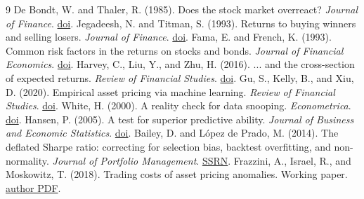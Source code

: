 \documentclass[10pt,a4paper]{article}
\begin{document}
\begin{thebibliography}{9}
 De Bondt, W. and Thaler, R. (1985). Does the stock market overreact? \emph{Journal of Finance}. \href{https://doi.org/10.1111/j.1540-6261.1985.tb05004.x}{doi}.
 Jegadeesh, N. and Titman, S. (1993). Returns to buying winners and selling losers. \emph{Journal of Finance}. \href{https://doi.org/10.1111/j.1540-6261.1993.tb04702.x}{doi}.
 Fama, E. and French, K. (1993). Common risk factors in the returns on stocks and bonds. \emph{Journal of Financial Economics}. \href{https://doi.org/10.1016/0304-405X(93)90023-5}{doi}.
 Harvey, C., Liu, Y., and Zhu, H. (2016). ... and the cross-section of expected returns. \emph{Review of Financial Studies}. \href{https://doi.org/10.1093/rfs/hhv059}{doi}.
 Gu, S., Kelly, B., and Xiu, D. (2020). Empirical asset pricing via machine learning. \emph{Review of Financial Studies}. \href{https://doi.org/10.1093/rfs/hhaa009}{doi}.
 White, H. (2000). A reality check for data snooping. \emph{Econometrica}. \href{https://doi.org/10.1111/1468-0262.00152}{doi}.
 Hansen, P. (2005). A test for superior predictive ability. \emph{Journal of Business and Economic Statistics}. \href{https://doi.org/10.1198/073500105000000063}{doi}.
 Bailey, D. and L{\'o}pez de Prado, M. (2014). The deflated Sharpe ratio: correcting for selection bias, backtest overfitting, and non-normality. \emph{Journal of Portfolio Management}. \href{https://papers.ssrn.com/sol3/papers.cfm?abstract_id=2460551}{SSRN}.
 Frazzini, A., Israel, R., and Moskowitz, T. (2018). Trading costs of asset pricing anomalies. Working paper. \href{https://pages.stern.nyu.edu/\string~afrazzin/pdf/Trading\%20Cost\%20of\%20Asset\%20Pricing\%20Anomalies\%20-\%20Frazzini\%2C\%20Israel\%20and\%20Moskowitz.pdf}{author PDF}.
\end{thebibliography}
\end{document}
